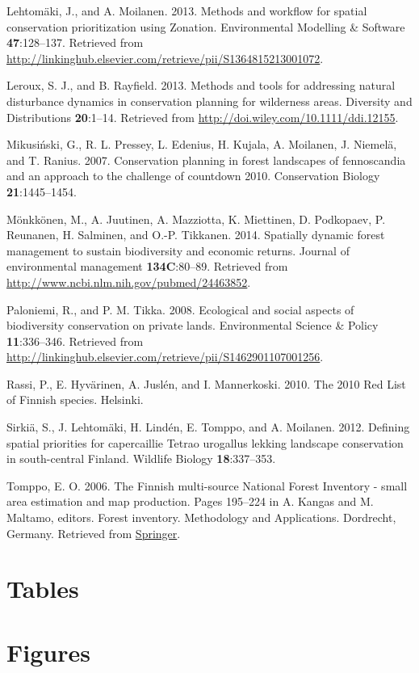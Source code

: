 \documentclass[]{article}
\begin{document}
Lehtomäki, J., and A. Moilanen. 2013. Methods and workflow for spatial
conservation prioritization using Zonation. Environmental Modelling \&
Software \textbf{47}:128--137. Retrieved from
\url{http://linkinghub.elsevier.com/retrieve/pii/S1364815213001072}.

Leroux, S. J., and B. Rayfield. 2013. Methods and tools for addressing
natural disturbance dynamics in conservation planning for wilderness
areas. Diversity and Distributions \textbf{20}:1--14. Retrieved from
\url{http://doi.wiley.com/10.1111/ddi.12155}.

Mikusiński, G., R. L. Pressey, L. Edenius, H. Kujala, A. Moilanen, J.
Niemelä, and T. Ranius. 2007. Conservation planning in forest landscapes
of fennoscandia and an approach to the challenge of countdown 2010.
Conservation Biology \textbf{21}:1445--1454.

Mönkkönen, M., A. Juutinen, A. Mazziotta, K. Miettinen, D. Podkopaev, P.
Reunanen, H. Salminen, and O.-P. Tikkanen. 2014. Spatially dynamic
forest management to sustain biodiversity and economic returns. Journal
of environmental management \textbf{134C}:80--89. Retrieved from
\url{http://www.ncbi.nlm.nih.gov/pubmed/24463852}.

Paloniemi, R., and P. M. Tikka. 2008. Ecological and social aspects of
biodiversity conservation on private lands. Environmental Science \&
Policy \textbf{11}:336--346. Retrieved from
\url{http://linkinghub.elsevier.com/retrieve/pii/S1462901107001256}.

Rassi, P., E. Hyvärinen, A. Juslén, and I. Mannerkoski. 2010. The 2010
Red List of Finnish species. Helsinki.

Sirkiä, S., J. Lehtomäki, H. Lindén, E. Tomppo, and A. Moilanen. 2012.
Defining spatial priorities for capercaillie Tetrao urogallus lekking
landscape conservation in south-central Finland. Wildlife Biology
\textbf{18}:337--353.

Tomppo, E. O. 2006. The Finnish multi-source National Forest Inventory -
small area estimation and map production. Pages 195--224 in A. Kangas
and M. Maltamo, editors. Forest inventory. Methodology and Applications.
Dordrecht, Germany. Retrieved from \url{Springer}.

\section{Tables}

\section{Figures}
\end{document}
